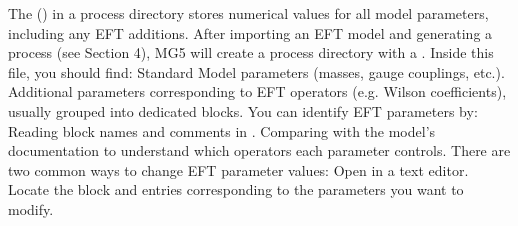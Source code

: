 {}\markdownRendererThematicBreak{}\markdownRendererInterblockSeparator
{}
\markdownRendererSectionEnd 
\markdownRendererSectionEnd \markdownRendererSectionBegin
{}\markdownRendererInterblockSeparator
{}The  () in a process directory stores numerical values for all model parameters, including any EFT additions.\markdownRendererInterblockSeparator
{}\markdownRendererSectionBegin
{}\markdownRendererInterblockSeparator
{}After importing an EFT model and generating a process (see Section 4), MG5 will create a process directory with a . Inside this file, you should find:\markdownRendererInterblockSeparator
{}\markdownRendererUlBeginTight
\markdownRendererUlItem Standard Model parameters (masses, gauge couplings, etc.).\markdownRendererUlItemEnd 
\markdownRendererUlItem Additional parameters corresponding to EFT operators (e.g. Wilson coefficients), usually grouped into dedicated blocks.\markdownRendererUlItemEnd 
\markdownRendererUlEndTight \markdownRendererInterblockSeparator
{}You can identify EFT parameters by:\markdownRendererInterblockSeparator
{}\markdownRendererUlBeginTight
\markdownRendererUlItem Reading block names and comments in .\markdownRendererUlItemEnd 
\markdownRendererUlItem Comparing with the model’s documentation to understand which operators each parameter controls.\markdownRendererUlItemEnd 
\markdownRendererUlEndTight \markdownRendererInterblockSeparator
{}
\markdownRendererSectionEnd \markdownRendererSectionBegin
{}\markdownRendererInterblockSeparator
{}There are two common ways to change EFT parameter values:\markdownRendererInterblockSeparator
{}\markdownRendererOlBegin
{}\markdownRendererInterblockSeparator
{}\markdownRendererUlBeginTight
\markdownRendererUlItem Open  in a text editor.\markdownRendererUlItemEnd 
\markdownRendererUlItem Locate the block and entries corresponding to the parameters you want to modify.\markdownRendererUlItemEnd 
